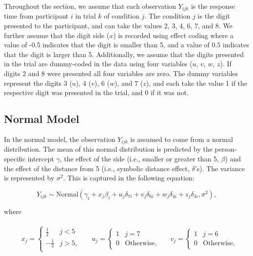 \documentclass[
  english,
  doc,floatsintext]{apa6}
\begin{document}
Throughout the section, we assume that each observation \(Y_{ijk}\) is the response time from participant \(i\) in trial \(k\) of condition \(j\). The condition \(j\) is the digit presented to the participant, and can take the values 2, 3, 4, 6, 7, and 8. We further assume that the digit side (\(x\)) is recorded using effect coding where a value of -0.5 indicates that the digit is smaller than 5, and a value of 0.5 indicates that the digit is larger than 5. Additionally, we assume that the digits presented in the trial are dummy-coded in the data using four variables (\(u\), \(v\), \(w\), \(z\)). If digits 2 and 8 were presented all four variables are zero. The dummy variables represent the digits 3 (\(u\)), 4 (\(v\)), 6 (\(w\)), and 7 (\(z\)), and each take the value 1 if the respective digit was presented in the trial, and 0 if it was not.

\hypertarget{normal-model}{%
\subsection{Normal Model}\label{normal-model}}

In the normal model, the observation \(Y_{ijk}\) is assumed to come from a normal distribution. The mean of this normal distribution is predicted by the person-specific intercept \(\gamma\), the effect of the side (i.e., smaller or greater than 5, \(\beta\)) and the effect of the distance from 5 (i.e., symbolic distance effect, \(\delta\)'s). The variance is represented by \(\sigma^2\). This is captured in the following equation:

\begin{equation}
Y_{ijk} \sim \text{Normal}(\gamma_{i} + x_j \beta_{i} + u_j \delta_{7i} + v_j \delta_{6 i} + w_j \delta_{4i} + z_j \delta_{3i}, \sigma^2), \label{eq:datalevel}
\end{equation}

where

\begin{align*}
&
\begin{aligned}
x_j = 
\begin{cases}
\frac{1}{2} & j < 5\\
- \frac{1}{2} & j > 5, \\
\end{cases}
\end{aligned}
&
\begin{aligned}
u_j = 
\begin{cases}
1 & j = 7\\
0 & \text{Otherwise},
\end{cases}
\end{aligned}
&
\begin{aligned}
v_j = 
\begin{cases}
1 & j = 6\\
0 & \text{Otherwise},
\end{cases}
\end{aligned}
\end{align*}
\end{document}
